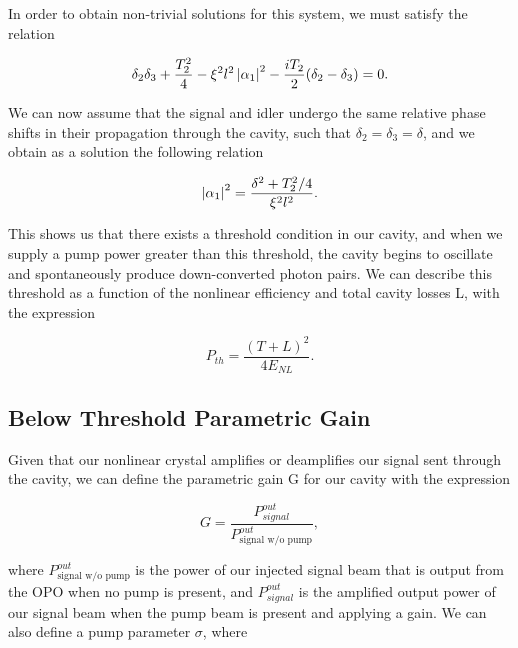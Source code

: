 \noindent
In order to obtain non-trivial solutions for this system, we must satisfy the relation

\begin{equation}
  \label{eq:non_triv}
  \delta_2 \delta_3 + \frac{T^2_2}{4} - \xi^2l^2 \left| \alpha_1 \right|^2 - \frac{iT_2}{2}(\delta_2 - \delta_3) = 0.
\end{equation}

\noindent
We can now assume that the signal and idler undergo the same relative phase shifts in their propagation through the cavity, such that  $\delta_2 = \delta_3 = \delta$, and we obtain as a solution the following relation \cite{joffre} 

\begin{equation}
  \label{eq:pdc_gain}
  \left| \alpha_1 \right|^2 = \frac{\delta^2 + T^2_2/4}{\xi^2 l^2} .
\end{equation}

\noindent
This shows us that there exists a threshold condition in our cavity, and when we supply a pump power greater than this threshold, the cavity begins to oscillate and spontaneously produce down-converted photon pairs.  We can describe this threshold as a function of the nonlinear efficiency and total cavity losses L, with the expression

\begin{equation}
  \label{eq:threshold_enl}
  P_{th} = \frac{(T+L)^2}{4E_{NL}} .
\end{equation}



\subsection{Below Threshold Parametric Gain} 
\label{below_threshold_parametric_gain} 

Given that our nonlinear crystal amplifies or deamplifies our signal sent through the cavity, we can define the parametric gain G for our cavity with the expression

\begin{equation}
  \label{eq:pg_cav}
  G = \frac{P^{out}_{signal}}{P^{out}_{\text{signal w/o pump}}} ,
\end{equation}

\noindent
where $P^{out}_{\text{signal w/o pump}}$ is the power of our injected signal beam that is output from the OPO when no pump is present, and $P^{out}_{signal}$ is the amplified output power of our signal beam when the pump beam is present and applying a gain.  We can also define a pump parameter $\sigma$, where


